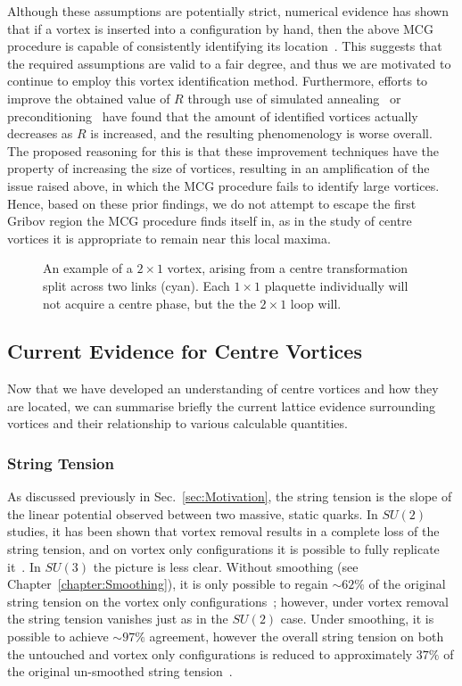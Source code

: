 Although these assumptions are potentially strict, numerical evidence has shown that if a vortex is inserted into a configuration by hand, then the above MCG procedure is capable of consistently identifying its location~\cite{Faber:1999gu,Montero:1999by}. This suggests that the required assumptions are valid to a fair degree, and thus we are motivated to continue to employ this vortex identification method. Furthermore, efforts to improve the obtained value of $R$ through use of simulated annealing~\cite{Bogolubsky:2009dc} or preconditioning~\cite{Cais:2008za} have found that the amount of identified vortices actually decreases as $R$ is increased, and the resulting phenomenology is worse overall. The proposed reasoning for this is that these improvement techniques have the property of increasing the size of vortices, resulting in an amplification of the issue raised above, in which the MCG procedure fails to identify large vortices. Hence, based on these prior findings, we do not attempt to escape the first Gribov region the MCG procedure finds itself in, as in the study of centre vortices it is appropriate to remain near this local maxima.
%
\begin{figure}[htb!]
\centering

\caption[An example of a $2\times 1$ vortex, arising from a centre transformation split across two links.]{\label{fig:MultipleLink} An example of a $2\times 1$ vortex, arising from a centre transformation split across two links (cyan). Each $1\times 1$ plaquette individually will not acquire a centre phase, but the the $2\times 1$ loop will.}
\end{figure}

\subsection{Current Evidence for Centre Vortices}\label{sec:CurrentEvidence}
Now that we have developed an understanding of centre vortices and how they are located, we can summarise briefly the current lattice evidence surrounding vortices and their relationship to various calculable quantities.
 
\subsubsection{String Tension}
As discussed previously in Sec.~\ref{sec:Motivation}, the string tension is the slope of the linear potential observed between two massive, static quarks. In $SU(2)$ studies, it has been shown that vortex removal results in a complete loss of the string tension, and on vortex only configurations it is possible to fully replicate it~\cite{Cais:2008za}. In $SU(3)$ the picture is less clear. Without smoothing (see Chapter~\ref{chapter:Smoothing}), it is only possible to regain $\sim 62\%$ of the original string tension on the vortex only configurations~\cite{Langfeld:2003ev}; however, under vortex removal the string tension vanishes just as in the $SU(2)$ case. Under smoothing, it is possible to achieve $\sim 97\%$ agreement, however the overall string tension on both the untouched and vortex only configurations is reduced to approximately $37\%$ of the original un-smoothed string tension~\cite{Trewartha:2015ida}.  

